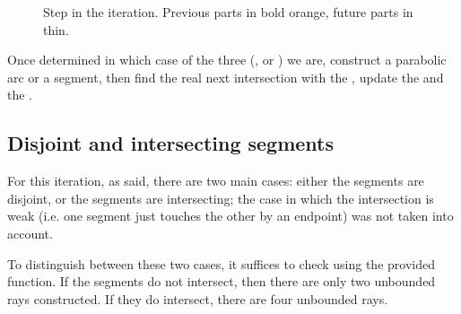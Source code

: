 \documentclass[11pt,a4paper,english]{article}
\begin{document}
	\begin{figure}[h]
    \centering
    \caption{Step in the iteration. Previous parts in bold orange, future parts in thin. \label{fig:iteration_shoot}}
	\end{figure}
	
	Once determined in which case of the three (,  or ) we are, construct a parabolic arc or a segment, then find the real next intersection with the , update the  and the .
	
	\subsection{Disjoint and intersecting segments}
	For this iteration, as said, there are two main cases: either the segments are disjoint, or the segments are intersecting; the case in which the intersection is weak (i.e. one segment just touches the other by an endpoint) was not taken into account.\par
	To distinguish between these two cases, it suffices to check using the provided  function. If the segments do not intersect, then there are only two unbounded rays constructed. If they do intersect, there are four unbounded rays.
\end{document}

